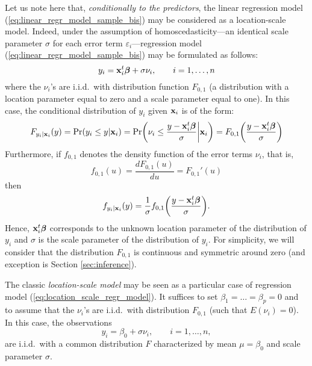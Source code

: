 Let us note here that, \emph{conditionally to the predictors}, the linear
regression model (\ref{eq:linear_regr_model_sample_bis}) may be considered as a
location-scale model. Indeed, under the assumption of homoscedasticity---an
identical scale parameter $\sigma$ for each error term
$\varepsilon_i$---regression model (\ref{eq:linear_regr_model_sample_bis})
may be formulated as follows:
%
\begin{equation}
    \label{eq:location_scale_regr_model}
    y_i = \mathbf x_i^t\boldsymbol\beta + \sigma\nu_i, 
    \qquad i = 1, \dots, n
\end{equation}
%
where the $\nu_i$'s are i.i.d.\ with distribution function $F_{0,1}$ (a
distribution with a location parameter equal to zero and a scale parameter
equal to one). In this case, the conditional distribution of $y_i$ given
$\mathbf x_i$ is of the form:
%
\begin{equation}
    \label{eq:distr_function_yi}
    F_{y_i | \stvec{x}_i}(y) 
    = \Pr(y_i \leq y | \stvec{x}_i) 
    = \Pr\left(\nu_i \leq \frac{y - \stvec{x}_i^t\boldsymbol\beta}{\sigma} \bigg| \stvec{x}_i\right)
    = F_{0,1}\left(\frac{y - \stvec{x}_i^t\boldsymbol\beta}{\sigma}\right)
\end{equation}
%
Furthermore, if $f_{0,1}$ denotes the density function of the error terms 
$\nu_i$, that is,
\[
    f_{0,1}(u) = \frac{d F_{0,1}(u)}{d u} = F_{0,1}'(u)
\]
then
%
\begin{equation}
    \label{eq:dens_function_yi}
    f_{y_i | \stvec{x}_i}(y) 
    = \frac{1}{\sigma} f_{0,1}\left(\frac{y - \stvec{x}_i^t\boldsymbol\beta}{\sigma}\right).
\end{equation}
%
Hence, $\mathbf x_i^t\boldsymbol\beta$ corresponds to the unknown location
parameter of the distribution of $y_i$ and $\sigma$ is the scale parameter of
the distribution of $y_i$. For simplicity, we will consider that the
distribution $F_{0,1}$ is continuous and symmetric around zero (and exception
is Section \ref{sec:inference}).

\begin{stremark}
The classic \emph{location-scale model} may be seen as a particular case of
regression model (\ref{eq:location_scale_regr_model}). It suffices to set
$\beta_1 = \dots = \beta_p = 0$ and to assume that the $\nu_i$'s are
i.i.d.\ with distribution $F_{0,1}$ (such that $E(\nu_i)=0$). In this case,
the observations
%
\begin{equation}
    \label{eq:location_scale_model}
    y_i = \beta_0 + \sigma\nu_i,
    \qquad i=1, \dots, n,
\end{equation}
%
are i.i.d.\ with a common distribution $F$ characterized by mean $\mu =
\beta_0$ and scale parameter $\sigma$.
\end{stremark}

